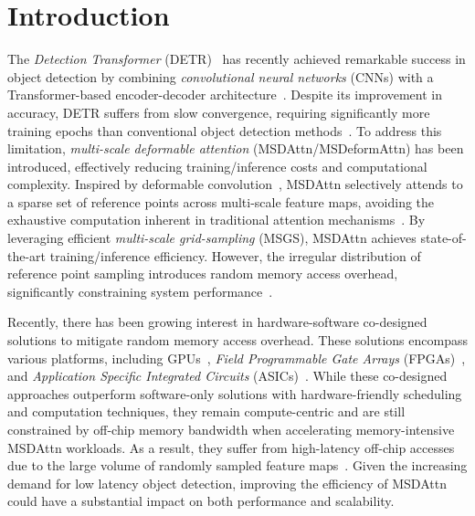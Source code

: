 \documentclass[sigconf]{acmart}
\begin{document}

\maketitle

\section{Introduction}

The \textit{Detection Transformer} (DETR)~\cite{carion2020end, gupta2022ow, beal2020toward, Fang2021} has recently achieved remarkable success in object detection by combining \textit{convolutional neural networks} (CNNs) with a Transformer-based encoder-decoder architecture~\cite{Vaswani17}. Despite its improvement in accuracy, DETR suffers from slow convergence, requiring significantly more training epochs than conventional object detection methods~\cite{du2018understanding, xie2021oriented, chen2016r}. {To address this limitation, \textit{multi-scale deformable attention} (MSDAttn/MSDeformAttn) has been introduced, effectively reducing training/inference costs and computational complexity.} Inspired by deformable convolution~\cite{Dai2017ICCV}, MSDAttn selectively attends to a sparse set of reference points across multi-scale feature maps, avoiding the exhaustive computation inherent in traditional attention mechanisms~\cite{Vaswani17}. By leveraging efficient \textit{multi-scale grid-sampling} (MSGS), MSDAttn achieves state-of-the-art training/inference efficiency. However, the irregular distribution of reference point sampling introduces random memory access overhead, significantly constraining system performance~\cite{xu2024defa}.


Recently, there has been growing interest in hardware-software co-designed solutions to mitigate random memory access overhead. These solutions encompass various platforms, including GPUs~\cite{zhu2021deformable, longformer20, Tay20, Rajpurkar18}, \textit{Field Programmable Gate Arrays} (FPGAs)~\cite{Zhang21fpga, Fan2022fpga, bai2024dac, Zhang21}, and \textit{Application Specific Integrated Circuits} (ASICs)~\cite{xu2024defa, Qu22, Qin23isca, Lu21}. While these co-designed approaches outperform software-only solutions with hardware-friendly scheduling and computation techniques, they remain compute-centric and are still constrained by off-chip memory bandwidth when accelerating memory-intensive MSDAttn workloads. As a result, they suffer from high-latency off-chip accesses due to the large volume of randomly sampled feature maps~\cite{xu2024defa}. Given the increasing demand for low latency object detection, improving the efficiency of MSDAttn could have a substantial impact on both performance and scalability.
\end{document}
